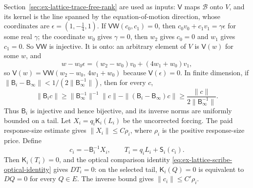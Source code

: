 Section~\ref{sec:ex-lattice-trace-free-rank} are used as inputs:
$\mathsf V$ maps $\mathcal B$ onto $V$, and its kernel is the line
spanned by the equation-of-motion direction, whose coordinates are
$\epsilon=(1,-\tfrac14,1)$. If $\mathsf V\mathsf W(c_0,c_1)=0$, then
$c_0v_0+c_1v_1=\gamma\epsilon$ for some real $\gamma$; the coordinate
$w_0$ gives $\gamma=0$, then $w_2$ gives $c_0=0$ and $w_1$ gives
$c_1=0$. So $\mathsf V\mathsf W$ is injective. It is onto: an arbitrary
element of $V$ is $\mathsf V(w)$ for some $w$, and
\[
 w-w_0\epsilon=(w_2-w_0)v_0+(4w_1+w_0)v_1,
\]
so $\mathsf V(w)=\mathsf V\mathsf W(w_2-w_0,\,4w_1+w_0)$ because
$\mathsf V(\epsilon)=0$. In finite dimension, if
$\|\mathsf B_i-\mathsf B_\infty\|<1/(2\|\mathsf B_\infty^{-1}\|)$,
then for every $c$,
\[
 \|\mathsf B_i c\|\ge
 \|\mathsf B_\infty^{-1}\|^{-1}\|c\|-\|
   (\mathsf B_i-\mathsf B_\infty)c\|
 \ge \frac{\|c\|}{2\|\mathsf B_\infty^{-1}\|}.
\]
Thus $\mathsf B_i$ is injective and hence bijective, and its inverse norms
are uniformly bounded on a tail. Let $X_i=q_i\mathsf K_i(L_i)$ be the
uncorrected forcing. The paid response-size estimate gives
$\|X_i\|\le C\rho_i$, where $\rho_i$ is the positive response-size
price. Define
\[
 c_i=-\mathsf B_i^{-1}X_i,\qquad
 T_i=q_iL_i+\mathsf S_i(c_i).
\]
Then $\mathsf K_i(T_i)=0$, and the optical comparison identity
\eqref{eq:ex-lattice-scribe-optical-identity} gives
$DT_i=0$: on the selected tail, $\mathsf K_i(Q)=0$ is equivalent to
$DQ=0$ for every $Q\in E$. The inverse bound gives
$\|c_i\|\le C'\rho_i$.

